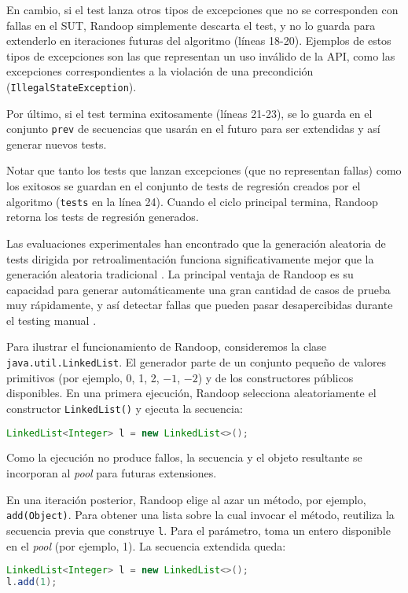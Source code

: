 En cambio, si el test lanza otros tipos de excepciones que no se corresponden
con fallas en el SUT, \textsf{Randoop} simplemente descarta el test, y no lo guarda para
extenderlo en iteraciones futuras del algoritmo (líneas 18-20). Ejemplos de
estos tipos de excepciones son las que representan un uso inválido de la API,
como las excepciones correspondientes a la violación de una
precondición (\texttt{IllegalStateException}).

Por último, si el test termina exitosamente (líneas 21-23), se lo guarda en el
conjunto \texttt{prev} de secuencias que usarán en el futuro para ser extendidas
y así generar nuevos tests. 

Notar que tanto los tests que lanzan excepciones (que no representan fallas) como los 
exitosos se guardan en el conjunto de tests de regresión creados por el
algoritmo (\texttt{tests} en la línea 24). Cuando el ciclo principal termina,
\textsf{Randoop} retorna los tests de regresión generados.

Las evaluaciones experimentales han encontrado que la generación aleatoria de tests dirigida 
por retroalimentación funciona significativamente mejor que la generación
aleatoria tradicional \cite{Pacheco07,Pacheco08}.
La principal ventaja de \textsf{Randoop} es su capacidad para generar
automáticamente una gran cantidad de casos de prueba muy rápidamente, y así 
detectar fallas que pueden pasar desapercibidas durante el testing
manual \cite{Pacheco07,Pacheco08}.



Para ilustrar el funcionamiento de Randoop, consideremos la clase
\texttt{java.util.LinkedList}. El generador parte de un conjunto pequeño de
valores primitivos (por ejemplo, 0, 1, 2, $-1$, $-2$) y de los
constructores públicos disponibles. En una primera ejecución, Randoop
selecciona aleatoriamente el constructor \texttt{LinkedList()} y
ejecuta la secuencia:
\\
\begin{lstlisting}[language=Java,basicstyle=\ttfamily\small,columns=fullflexible,keepspaces=true]
LinkedList<Integer> l = new LinkedList<>();
\end{lstlisting}

Como la ejecución no produce fallos, la secuencia y el objeto resultante
se incorporan al \emph{pool} para futuras extensiones.

En una iteración posterior, Randoop elige al azar un método, por ejemplo,
\texttt{add(Object)}. Para obtener una lista sobre la cual invocar el
método, reutiliza la secuencia previa que construye \texttt{l}. Para el
parámetro, toma un entero disponible en el \emph{pool} (por ejemplo, 1).
La secuencia extendida queda:
\\
\begin{lstlisting}[language=Java,basicstyle=\ttfamily\small,columns=fullflexible,keepspaces=true]
LinkedList<Integer> l = new LinkedList<>();
l.add(1);
\end{lstlisting}


